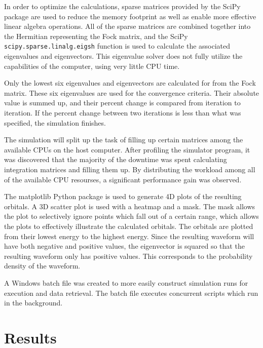 \documentclass[10pt, oneside, letterpaper]{article}
\begin{document}
In order to optimize the calculations, sparse matrices provided by the SciPy package are used to reduce the memory footprint as well as enable more effective linear algebra operations. All of the sparse matrices are combined together into the Hermitian representing the Fock matrix, and the SciPy \texttt{scipy.sparse.linalg.eigsh} function is used to calculate the associated eigenvalues and eigenvectors. This eigenvalue solver does not fully utilize the capabilities of the computer, using very little CPU time.

Only the lowest six eigenvalues and eigenvectors are calculated for from the Fock matrix. These six eigenvalues are used for the convergence criteria. Their absolute value is summed up, and their percent change is compared from iteration to iteration. If the percent change between two iterations is less than what was specified, the simulation finishes.

The simulation will split up the task of filling up certain matrices among the available CPUs on the host computer. After profiling the simulator program, it was discovered that the majority of the downtime was spent calculating integration matrices and filling them up. By distributing the workload among all of the available CPU resourses, a significant performance gain was observed.

The matplotlib Python package is used to generate 4D plots of the resulting orbitals. A 3D scatter plot is used with a heatmap and a mask. The mask allows the plot to selectively ignore points which fall out of a certain range, which allows the plots to effectively illustrate the calculated orbitals. The orbitals are plotted from their lowest energy to the highest energy. Since the resulting waveform will have both negative and positive values, the eigenvector is squared so that the resulting waveform only has positive values. This corresponds to the probability density of the waveform.

A Windows batch file was created to more easily construct simulation runs for execution and data retrieval. The batch file executes concurrent scripts which run in the background.

\newpage
\section{Results}
\end{document}

